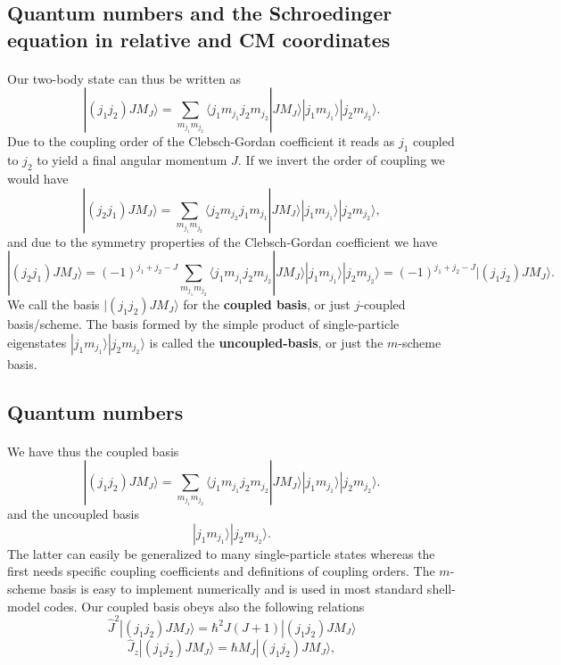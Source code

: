 \documentclass[%
twoside,                 %
final,                   %
10pt]{article}
\begin{document}
\subsection*{Quantum numbers and the Schroedinger equation in relative and CM coordinates}

\paragraph{}
Our two-body state can thus be written as 
\[
|(j_1j_2)JM_J\rangle=\sum_{m_{j_1}m_{j_2}}\langle j_1m_{j_1}j_2m_{j_2}|JM_J\rangle|j_1m_{j_1}\rangle|j_2m_{j_2}\rangle.
\]
Due to the coupling order of the Clebsch-Gordan coefficient it reads as 
$j_1$ coupled to $j_2$ to yield a final angular momentum $J$. If we invert the order of coupling we would have
\[
|(j_2j_1)JM_J\rangle=\sum_{m_{j_1}m_{j_2}}\langle j_2m_{j_2}j_1m_{j_1}|JM_J\rangle|j_1m_{j_1}\rangle|j_2m_{j_2}\rangle,
\]
and due to the symmetry properties of the Clebsch-Gordan coefficient we have
\[
|(j_2j_1)JM_J\rangle=(-1)^{j_1+j_2-J}\sum_{m_{j_1}m_{j_2}}\langle j_1m_{j_1}j_2m_{j_2}|JM_J\rangle|j_1m_{j_1}\rangle|j_2m_{j_2}\rangle=(-1)^{j_1+j_2-J}|(j_1j_2)JM_J\rangle.
\]
We call the basis $|(j_1j_2)JM_J\rangle$ for the \textbf{coupled basis}, or just $j$-coupled basis/scheme. The basis formed by the simple product of single-particle eigenstates 
$|j_1m_{j_1}\rangle|j_2m_{j_2}\rangle$ is called the \textbf{uncoupled-basis}, or just the $m$-scheme basis.



\subsection*{Quantum numbers}

\paragraph{}
We have thus the coupled basis 
\[
|(j_1j_2)JM_J\rangle=\sum_{m_{j_1}m_{j_2}}\langle j_1m_{j_1}j_2m_{j_2}|JM_J\rangle|j_1m_{j_1}\rangle|j_2m_{j_2}\rangle.
\]
and the uncoupled basis 
\[
|j_1m_{j_1}\rangle|j_2m_{j_2}\rangle.
\]
The latter can easily be generalized to many single-particle states whereas the first 
needs specific coupling coefficients and definitions of coupling orders. 
The $m$-scheme basis is easy to implement numerically and is used in most standard shell-model codes. 
Our coupled basis obeys also the following relations
\[
   \hat{J}^2|(j_1j_2)JM_J\rangle=\hbar^2J(J+1)|(j_1j_2)JM_J\rangle
\]
\[
   \hat{J}_z|(j_1j_2)JM_J\rangle=\hbar M_J|(j_1j_2)JM_J\rangle,
\]
\end{document}
